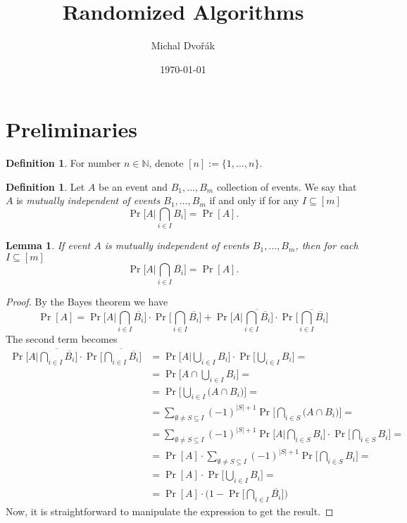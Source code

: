 \documentclass{article}
\title{Randomized Algorithms}
\author{Michal Dvořák}
\date{\today}
\theoremstyle{plain}
\newtheorem{lem}[thm]{Lemma}
\theoremstyle{definition}
\newtheorem{defn}[thm]{Definition}
\begin{document}
\maketitle

\section{Preliminaries}
\begin{defn}
	For number $n\in\mathbb{N}$, denote $[n]:=\{1,\ldots, n\}$.
\end{defn}
\begin{defn}
	Let $A$ be an event and $B_1,\ldots, B_m$ collection of events. We say that $A$ is \textit{mutually independent of events $B_1,\ldots, B_m$} if and only if for any $I\subseteq [m]$
	$$
	\Pr\bigg[A\bigg| \bigcap_{i\in I}B_i\bigg]=\Pr[A].
	$$
\end{defn}

\begin{lem}
	If event $A$ is mutually independent of events $B_1,\ldots, B_m$, then for each $I\subseteq [m]$ 
	$$
	\Pr\bigg[A\bigg| \bigcap_{i\in I}\overline{B_i}\bigg]=\Pr[A].
	$$
\end{lem}
\begin{proof}
	By the Bayes theorem we have
	$$
		\Pr[A]=\Pr\bigg[A\bigg | \bigcap_{i\in I} \overline{B_i}\bigg]\cdot \Pr\bigg[\bigcap_{i\in I} \overline{B_i}\bigg]+\Pr\bigg[A\bigg | \overline{\bigcap_{i\in I} \overline{B_i}}\bigg]\cdot \Pr\bigg[\overline{\bigcap_{i\in I} \overline{B_i}}\bigg]
	$$
	The second term becomes
	\begin{align*}
	\Pr\bigg[A\bigg | \overline{\bigcap_{i\in I} \overline{B_i}}\bigg]\cdot \Pr\bigg[\overline{\bigcap_{i\in I} \overline{B_i}}\bigg] &= \Pr\bigg[A\bigg | \bigcup_{i\in I}B_i\bigg]\cdot \Pr\bigg[\bigcup_{i\in I} B_i\bigg] =\\&= \Pr\bigg[A\cap \bigcup_{i\in I}B_i\bigg]=\\&=\Pr\bigg[ \bigcup_{i\in I}\bigg(A\cap B_i\bigg)\bigg]=\\&=\sum_{\emptyset \neq S \subseteq I}(-1)^{|S|+1}\Pr\bigg[\bigcap_{i\in S}\bigg(A\cap B_i\bigg)\bigg]=\\&=\sum_{\emptyset \neq S \subseteq I}(-1)^{|S|+1}\Pr\bigg[A\bigg |\bigcap_{i\in S}B_i\bigg]\cdot \Pr\bigg[\bigcap_{i\in S}B_i\bigg]=\\&=\Pr[A]\cdot\sum_{\emptyset \neq S \subseteq I}(-1)^{|S|+1} \Pr\bigg[\bigcap_{i\in S}B_i\bigg]=\\&=\Pr[A]\cdot \Pr\bigg[\bigcup_{i\in I}B_i\bigg]=\\&=\Pr[A]\cdot \bigg(1-\Pr\bigg[\bigcap_{i\in I} \overline{B_i}\bigg]\bigg)
	\end{align*}
	Now, it is straightforward to manipulate the expression to get the result.
\end{proof}
\end{document}
